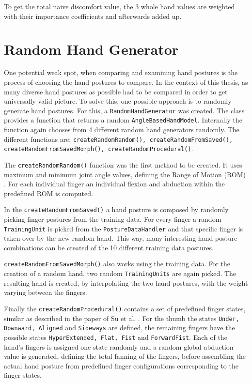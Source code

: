 To get the total naive discomfort value, the 3 whole hand values are weighted with their importance coefficients and afterwards added up.

\section{Random Hand Generator}

One potential weak spot, when comparing and examining hand postures is the process of choosing the hand postures to compare. In the context of this thesis, as many diverse hand postures as possible had to be compared in order to get universally valid picture. To solve this, one possible approach is to randomly generate hand postures. 
For this, a \texttt{RandomHandGenerator} was created. The class provides a function that returns a random \texttt{AngleBasedHandModel}. Internally the function again chooses from 4 different random hand generators randomly. The different functions are: \texttt{createRandomRandom(), createRandomFromSaved(), createRandomFromSavedMorph(), createRandomProcedural()}. 

The \texttt{createRandomRandom()} function was the first method to be created. It uses maximum and minimum joint angle values, defining the Range of Motion (ROM) \cite{apostolico2014postural}. For each individual finger an individual flexion and abduction within the predefined ROM is computed.

In the \texttt{createRandomFromSaved()} a hand posture is composed by randomly picking finger postures from the training data. For every finger a random \texttt{TrainingUnit} is picked from the \texttt{PostureDataHandler} and that specific finger is taken over by the new random hand. This way, many interesting hand posture combinations can be created of the 10 different training data postures.

\texttt{createRandomFromSavedMorph()} also works using the training data. For the creation of a random hand, two random \texttt{TrainingUnits} are again picked. The resulting hand is created, by interpolating the two hand postures, with the weight varying between the fingers. 

Finally the \texttt{createRandomProcedural()} contains a set of predefined finger states, similar as described in the paper of Su et al. \cite{su1994logical}. For the thumb the states \texttt{Under, Downward, Aligned} and \texttt{Sideways} are defined, the remaining fingers have the possible states \texttt{HyperExtended, Flat, Fist} and \texttt{ForwardFist}. Each of the hand's fingers is assigned one state randomly and a random global abduction value is generated, defining the total fanning of the fingers, before assembling the actual hand posture from predefined finger configurations corresponding to the finger states.

